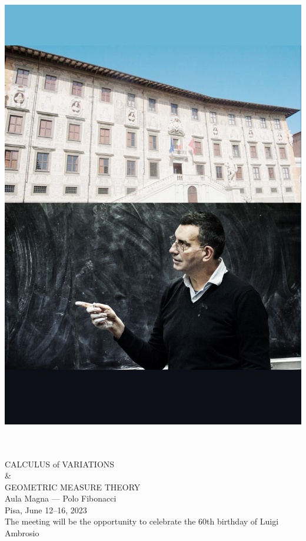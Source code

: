 \documentclass[a4paper]{article}
\newcommand{\buh}[1]{\textsf{#1}\\}
\begin{document}
\color{black}
\begin{center}
\mbox{}\\
\vspace{-1.5cm}
\includegraphics[scale=0.70]{sfondo.jpg}
\\
\vspace{-31cm}
\bigskip
\Huge
\buh{}
\large
\buh{}
\bigskip
\bf

\Huge
\buh{CALCULUS of VARIATIONS \\ \& \\ GEOMETRIC MEASURE THEORY}
\vspace{2cm}
\Large
\buh{Aula Magna --- Polo Fibonacci}
\vspace{2cm}
\huge
\buh{Pisa, June 12--16, 2023}
\Large
\bigskip
\buh{The meeting will be the opportunity to celebrate the 60th birthday of Luigi Ambrosio}
\end{center}
\end{document}

